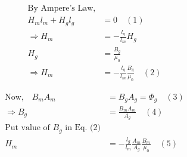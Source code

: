 \documentclass{article}
\begin{document}
\huge

\begin{align*}
    \text{By Ampere's Law,} \\ 
    H_m l_m + H_g l_g &= 0 \quad (1) \\[0.5cm]
    \Rightarrow H_m &= -\frac{l_g}{l_m} H_g \\[0.5cm]
    H_g &= \frac{B_g}{\mu_0} \\[0.5cm]
    \Rightarrow H_m &= -\frac{l_g}{l_m} \frac{B_g}{\mu_0} \quad (2)
\end{align*}



\begin{align*}
    \text{Now,} \quad B_m A_m &= B_g A_g = \Phi_g \quad (3) \\[0.5cm]
    \Rightarrow B_g &= \frac{B_m A_m}{A_g} \quad (4) \\[0.5cm]
    \text{Put value of } B_g \text{ in Eq. (2)} \\[0.5cm]
    H_m &= -\frac{l_g}{l_m} \frac{A_m}{A_g} \frac{B_m}{\mu_0} \quad (5)
\end{align*}
\end{document}
